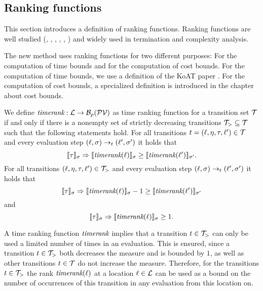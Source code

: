 \subsection{Ranking functions}

This section introduces a definition of ranking functions.
Ranking functions are well studied (\cite{bradley2005polyranking}, \cite{podelski2004prf}, \cite{bradley2005linear}, \cite{bagnara2012new}, \cite{leike2014ranking}, \cite{ben2013linear}) and widely used in termination and complexity analysis.

The new method uses ranking functions for two different purposes:
For the computation of time bounds and for the computation of cost bounds.
For the computation of time bounds, we use a definition of the KoAT paper \cite{koat}.
For the computation of cost bounds, a specialized definition is introduced in the chapter about cost bounds.

\begin{definition} 
  We define $\emph{timerank}: \mathcal{L} \rightarrow \mathcal{B}_p(\mathcal{PV})$ as time ranking function for a transition set $\mathcal{T}$ if and only if there is a nonempty set of strictly decreasing transitions $\mathcal{T}_{>} \subseteq \mathcal{T}$ such that the following statements hold.
  For all transitions $t = (\ell, \eta, \tau, \ell') \in \mathcal{T}$ and every evaluation step $(\ell, \sigma) \rightarrow_t (\ell', \sigma')$ it holds that
  \[ \llbracket \tau \rrbracket_{\sigma} \Rightarrow \llbracket \emph{timerank}(\ell) \rrbracket_{\sigma} \geq \llbracket \emph{timerank}(\ell') \rrbracket_{\sigma'}. \]
  For all transitions $(\ell, \eta, \tau, \ell') \in \mathcal{T}_{>}$ and every evaluation step $(\ell, \sigma) \rightarrow_t (\ell', \sigma')$ it holds that        
  \[ \llbracket \tau \rrbracket_{\sigma} \Rightarrow \llbracket \emph{timerank}(\ell) \rrbracket_{\sigma} - 1 \geq \llbracket \emph{timerank}(\ell') \rrbracket_{\sigma'} \]
  and
  \[ \llbracket \tau \rrbracket_{\sigma} \Rightarrow \llbracket \emph{timerank}(\ell) \rrbracket_{\sigma} \geq 1. \]
\end{definition}

A time ranking function $\emph{timerank}$ implies that a transition $t \in \mathcal{T}_>$ can only be used a limited number of times in an evaluation.
This is ensured, since a transition $t \in \mathcal{T}_>$ both decreases the measure and is bounded by $1$, as well as other transitions $t \in \mathcal{T}$ do not increase the measure.
Therefore, for the transitions $t \in \mathcal{T}_>$ the rank $\emph{timerank}(\ell)$ at a location $\ell \in \mathcal{L}$ can be used as a bound on the number of occurrences of this transition in any evaluation from this location on.

